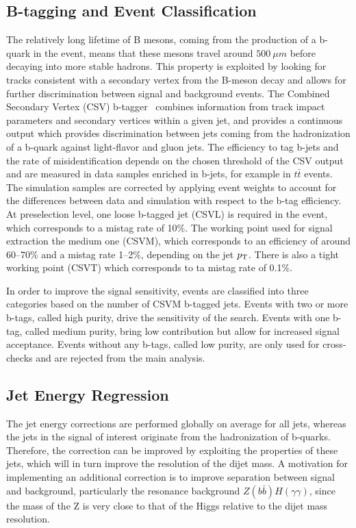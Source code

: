\subsection{B-tagging and Event Classification\label{subsec:btag}}

The relatively long lifetime of B mesons, coming from the production of a b-quark in the event,
means that these mesons travel around $500~\mu m$ before decaying into more stable hadrons.
This property is exploited by looking for tracks consistent with a secondary vertex from
the B-meson decay and allows for further discrimination between signal and background events.
The Combined Secondary Vertex (CSV) b-tagger~\cite{BTV} combines
information from track impact parameters and secondary vertices within a given jet, and
provides a continuous output which provides discrimination between jets coming from the
hadronization of a b-quark against light-flavor and gluon jets.
The efficiency to tag b-jets and the rate of misidentification depends on the chosen threshold
of the CSV output and are measured in data samples enriched in b-jets, for example in $t\bar{t}$ events.
The simulation samples are corrected by applying event weights to account for the
differences between data and simulation with respect to the b-tag efficiency.
At preselection level, one loose b-tagged jet (CSVL) is required in the event, which corresponds to
a mistag rate of 10\%. The working point used for signal extraction the medium one (CSVM),
which corresponds to an efficiency of around 60--70\%
and a mistag rate 1--2\%, depending on the jet $p_{\rm T}$.
There is also a tight working point (CSVT) which corresponds to ta mistag rate of 0.1\%.

In order to improve the signal sensitivity, events are classified into three categories
based on the number of CSVM b-tagged jets. Events with two or more b-tags, called high purity,
drive the sensitivity of the search. Events with one b-tag, called medium purity,
bring low contribution but allow for increased signal acceptance. Events without any b-tags,
called low purity, are only used for cross-checks and are rejected from the main analysis.


\subsection{Jet Energy Regression}

The jet energy corrections are performed globally on average for all jets, whereas the jets in
the signal of interest originate from the hadronization of b-quarks. Therefore, the correction
can be improved by exploiting the properties of these jets, which will in turn improve the resolution
of the dijet mass. A motivation for implementing an additional correction is to improve separation
between signal and background, particularly the resonance background $Z(b\bar{b})H(\gamma\gamma)$,
since the mass of the Z is very close to that of the Higgs relative to the dijet mass resolution.

